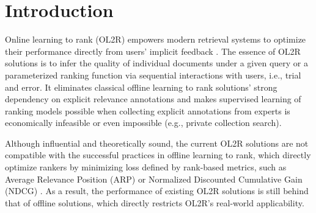 \section{Introduction}

Online learning to rank (OL2R) empowers modern retrieval systems to optimize their performance directly from users' implicit feedback \cite{wang2019variance,wang2018efficient,yue2009interactively,hofmann2013balancing,schuth2016multileave,zoghi2017online,lattimore2018toprank,oosterhuis2018differentiable,li2018online}. The essence of OL2R solutions is to infer the quality of individual documents under a given query \cite{radlinski2008learning,kveton2015cascading,zoghi2017online,lattimore2018toprank,li2018online}
or a parameterized ranking function \cite{wang2019variance,wang2018efficient,yue2009interactively,oosterhuis2018differentiable}
via sequential interactions with users, i.e., trial and error. It eliminates classical offline learning to rank solutions' strong dependency on explicit relevance annotations and makes supervised learning of ranking models possible when collecting explicit annotations from experts is economically infeasible or even impossible (e.g., private collection search). 

Although influential and theoretically sound, the current OL2R solutions are not compatible with the successful practices in offline learning to rank, which directly optimize rankers by minimizing loss defined by rank-based metrics, such as Average Relevance Position (ARP) \cite{joachims2017ips} or Normalized Discounted Cumulative Gain (NDCG) \cite{burges2010ranknet}. As a result, the performance of existing OL2R solutions is still behind that of offline solutions, which directly restricts OL2R's real-world applicability.

